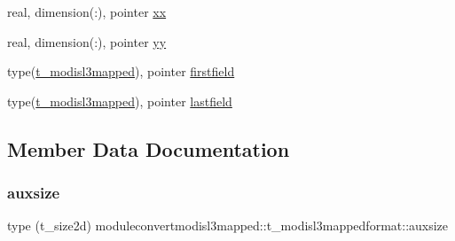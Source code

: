 \begin{DoxyCompactItemize}
real, dimension(\+:), pointer \mbox{\hyperlink{structmoduleconvertmodisl3mapped_1_1t__modisl3mappedformat_ab2959305cdeda86ede16c9c6830a6c52}{xx}}
\item 
real, dimension(\+:), pointer \mbox{\hyperlink{structmoduleconvertmodisl3mapped_1_1t__modisl3mappedformat_a801c2b5598b913d0330107662465fe7e}{yy}}
\item 
type(\mbox{\hyperlink{structmoduleconvertmodisl3mapped_1_1t__modisl3mapped}{t\+\_\+modisl3mapped}}), pointer \mbox{\hyperlink{structmoduleconvertmodisl3mapped_1_1t__modisl3mappedformat_a2eef85211635b4f6e63fe298af097faa}{firstfield}}
\item 
type(\mbox{\hyperlink{structmoduleconvertmodisl3mapped_1_1t__modisl3mapped}{t\+\_\+modisl3mapped}}), pointer \mbox{\hyperlink{structmoduleconvertmodisl3mapped_1_1t__modisl3mappedformat_af04e91479de1027b7df2ff92101b7173}{lastfield}}
\end{DoxyCompactItemize}


\subsection{Member Data Documentation}
\mbox{\label{structmoduleconvertmodisl3mapped_1_1t__modisl3mappedformat_ae83edf1bb61231cb32330d70b49019b0}} 
\subsubsection{\texorpdfstring{auxsize}{auxsize}}
{\footnotesize\ttfamily type (t\+\_\+size2d) moduleconvertmodisl3mapped\+::t\+\_\+modisl3mappedformat\+::auxsize\hspace{0.3cm}{\ttfamily [private]}}

\mbox{\label{structmoduleconvertmodisl3mapped_1_1t__modisl3mappedformat_ae30034b9a900ae281a5b641c031f842e}} 
